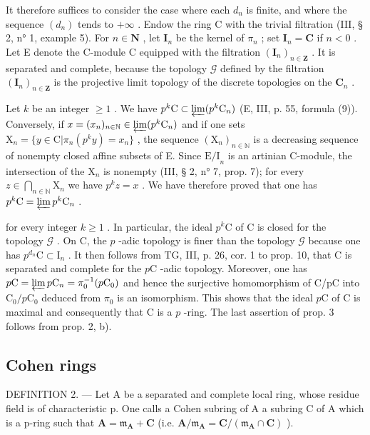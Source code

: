 It therefore suffices to consider the case where each \(d_{n}\) is finite, and where the sequence \((d_{n})\) tends to \(+\infty\) . Endow the ring C with the trivial filtration (III, § 2, n° 1, example 5). For \(n\in\mathbf{N}\) , let \(\mathbf{I}_{n}\) be the kernel of \(\pi_{n}\) ; set \(\mathbf{I}_{n}=\mathbf{C}\) if \(n<0\) . Let E denote the C-module C equipped with the filtration \((\mathbf{I}_{n})_{n\in\mathbf{Z}}\) . It is separated and complete, because the topology \(\mathcal{G}\) defined by the filtration \((\mathbf{I}_{n})_{n\in\mathbf{Z}}\) is the projective limit topology of the discrete topologies on the \(\mathbf{C}_{n}\) .

Let \(k\) be an integer \(\geqslant 1\) . We have \(p^{k}\mathrm{C} \subset \varprojlim (p^{k}\mathrm{C}_{n})\) (E, III, p. 55, formula (9)). Conversely, if \(x = (x_{n})_{n \in \mathbb{N}} \in \varprojlim (p^{k}\mathrm{C}_{n})\) and if one sets \(\mathrm{X}_{n} = \{y \in \mathrm{C}|\pi_{n}(p^{k}y) = x_{n}\}\) , the sequence \((\mathrm{X}_{n})_{n \in \mathbb{N}}\) is a decreasing sequence of nonempty closed affine subsets of E. Since \(\mathrm{E / I}_{n}\) is an artinian C-module, the intersection of the \(\mathrm{X}_{n}\) is nonempty (III, § 2, n° 7, prop. 7); for every \(z \in \bigcap_{n \in \mathbb{N}} \mathrm{X}_{n}\) we have \(p^{k}z = x\) . We have therefore proved that one has \(p^{k}\mathrm{C} = \varprojlim p^{k}\mathrm{C}_{n}\) .

for every integer \(k \geqslant 1\) . In particular, the ideal \(p^{k}\text{C}\) of C is closed for the topology \(\mathcal{G}\) . On C, the \(p\) -adic topology is finer than the topology \(\mathcal{G}\) because one has \(p^{d_{n}}\text{C} \subset \text{I}_{n}\) . It then follows from TG, III, p. 26, cor. 1 to prop. 10, that C is separated and complete for the \(p\text{C}\) -adic topology. Moreover, one has \(p\text{C} = \varprojlim p\text{C}_{n} = \pi_{0}^{-1}(p\text{C}_{0})\) and hence the surjective homomorphism of C/pC into \(\text{C}_{0}/p\text{C}_{0}\) deduced from \(\pi_{0}\) is an isomorphism. This shows that the ideal \(p\text{C}\) of C is maximal and consequently that C is a \(p\) -ring. The last assertion of prop. 3 follows from prop. 2, b).

\subsection{Cohen rings}

DEFINITION 2. --- Let A be a separated and complete local ring, whose residue field is of characteristic p. One calls a Cohen subring of A a subring C of A which is a p-ring such that \(\mathbf{A} = \mathfrak{m}_{\mathbf{A}} + \mathbf{C}\) (i.e. \(\mathbf{A}/\mathfrak{m}_{\mathbf{A}} = \mathbf{C}/(\mathfrak{m}_{\mathbf{A}} \cap \mathbf{C})\) ).

